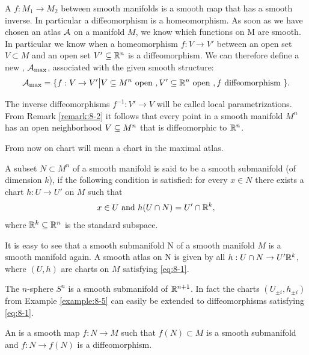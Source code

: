 A  $f: M_1\to M_2$ between smooth manifolds is a smooth map that
has a smooth inverse. In particular a diffeomorphism is a homeomorphism.
As soon as we have chosen an atlas $\mathcal{A}$ on a manifold $M$, we know which functions
on M are smooth. In particular we know when a homeomorphism $f:V\to V'$
between an open set $V\subset M$ and an open set $V'\subseteq \mathbb{R}^n$ is a diffeomorphism.
We can therefore define a new , $\mathcal{A}_{\max}$, associated with the given
smooth structure:
\begin{align*}
  \mathcal{A}_{\max} = \{
      f:V \to V'\big| 
        V \subseteq M^n \text{ open }, 
        V'\subseteq\mathbb{R}^n \text{ open }, 
        f \text{ diffeomorphism }
    \}.
\end{align*}

The inverse diffeomorphisms $f^{-1}: V'\to V$ will be called local parametrizations.
From Remark \ref{remark:8-2} it follows that every point in a smooth manifold $M^n$ has an
open neighborhood $V\subseteq M^n$ that is diffeomorphic to $\mathbb{R}^n$.

From now on chart will mean a chart in the maximal atlas.

\begin{definition}\label{def:8-8}
  A subset $N\subset M^n$ of a smooth manifold is said to be a smooth
  submanifold (of dimension $k$), if the following condition is satisfied: for every
  $x\in N$ there exists a chart $h:U\to U'$ on $M$ such that
  \begin{align}\label{eq:8-1}
    x\in U \text{ and } h(U\cap N) = U'\cap \mathbb{R}^k,
  \end{align}
  where $\mathbb{R}^k\subseteq\mathbb{R}^n$ is the standard subspace.
\end{definition}

It is easy to see that a smooth submanifold N of a smooth manifold $M$ is a smooth
manifold again. A smooth atlas on N is given by all $h:U\cap N\to U'\mathbb{R}^k$, where
$(U, h)$ are charts on $M$ satisfying \eqref{eq:8-1}.

\begin{example}\label{example:8-9}
  The $n$-sphere $S^n$ is a smooth submanifold of $\mathbb{R}^{n+1}$. In fact the
  charts $(U_{\pm i}, h_{\pm i})$ from Example \ref{example:8-5} can easily be extended to 
  diffeomorphisms satisfying \eqref{eq:8-1}.
\end{example}

\begin{definition}\label{def:8-10}
  An  is a smooth map $f:N\to M$ such that $f(N)\subset M$
  is a smooth submanifold and $f: N\to f (N)$ is a diffeomorphism.
\end{definition}


